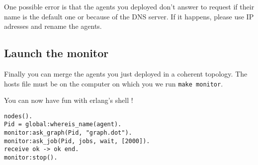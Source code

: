 \documentclass[a4paper, 11pt]{article}
\begin{document}
One possible error is that the agents you deployed don't answer to request if their name is the default one or because of the DNS server. If it happens, please use IP adresses and rename the agents.

\subsection{Launch the monitor}

Finally you can merge the agents you just deployed in a coherent topology. The hosts file must be on the computer on which you we run \verb|make monitor|.

\medskip\noindent You can now have fun with erlang's shell !
\begin{verbatim}
nodes().
Pid = global:whereis_name(agent).
monitor:ask_graph(Pid, "graph.dot").
monitor:ask_job(Pid, jobs, wait, [2000]).
receive ok -> ok end.
monitor:stop().
\end{verbatim}
\end{document}
